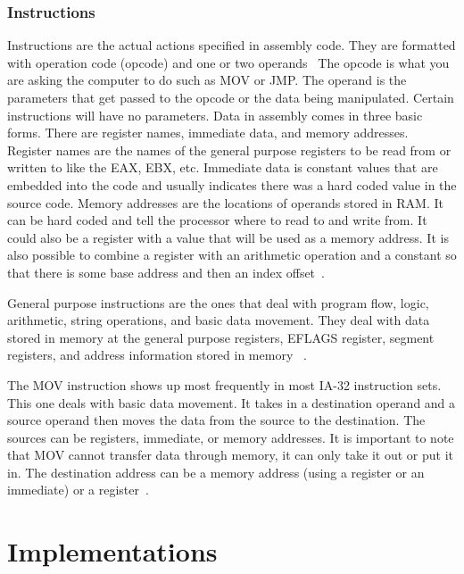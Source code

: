 \documentclass[12pt]{article}
\begin{document}
\subsubsection{Instructions}
Instructions are the actual actions specified in assembly code. They are formatted with operation code (opcode) and one or two operands~\cite{Reversing} The opcode is what you are asking the computer to do such as MOV or JMP. The operand is the parameters that get passed to the opcode or the data being manipulated. Certain instructions will have no parameters. Data in assembly comes in three basic forms. There are register names, immediate data, and memory addresses. Register names are the names of the general purpose registers to be read from or written to like the EAX, EBX, etc. Immediate data is constant values that are embedded into the code and usually indicates there was a hard coded value in the source code. Memory addresses are the locations of operands stored in RAM. It can be hard coded and tell the processor where to read to and write from. It could also be a register with a value that will be used as a memory address. It is also possible to combine a register with an arithmetic operation and a constant so that there is some base address and then an index offset~\cite{Reversing}.

General purpose instructions are the ones that deal with program flow, logic, arithmetic, string operations, and basic data movement. They deal with data stored in memory at the general purpose registers, EFLAGS register, segment registers, and address information stored in memory ~\cite{Reversing}.

The MOV instruction shows up most frequently in most IA-32 instruction sets. This one deals with basic data movement. It takes in a destination operand and a source operand then moves the data from the source to the destination. The sources can be registers, immediate, or memory addresses. It is important to note that MOV cannot transfer data through memory, it can only take it out or put it in. The destination address can be a memory address (using a register or an immediate) or a register~\cite{Reversing}.


\section{Implementations}
\end{document}
